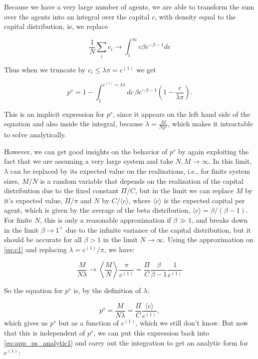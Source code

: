 Because we have a very large number of agents, we are able to transform the sum over the agents into an integral over the capital $c$, with density equal to the capital distribution, ie, we replace

\begin{equation}
\frac{1}{N} \sum_i c_i \to \int_1^\infty c \beta c^{-\beta - 1} dc
\end{equation}

Thus when we truncate by $c_i \leq \lambda \pi = c^{(1)}$ we get

\begin{equation}
\label{eq:app_ps_analytic1}
p^s = 1 - \int_1^{c^{(1)} = \lambda \pi} dc\, \beta c^{-\beta - 1} \left( 1 - \frac{c}{\lambda \pi} \right) .
\end{equation}

This is an implicit expression for $p^s$, since it appears on the left hand side of the equation and also inside the integral, because $\lambda = \frac{M}{N p^s}$, which makes it intractable to solve analytically. 

However, we can get good insights on the behavior of $p^s$ by again exploiting the fact that we are assuming a very large system and take $N, M \to \infty$. In this limit, $\lambda$ can be replaced by its expected value on the realizations, i.e., for finite system sizes, $M/N$ is a random variable that depends on the realization of the capital distribution due to the fixed constant $\Pi/C$, but in the limit we can replace $M$ by it's expected value, $\Pi/\pi$ and $N$ by $C / \langle c \rangle$, where $\langle c \rangle$ is the expected capital per agent, which is given by the average of the beta distribution, $\langle c \rangle = \beta/(\beta-1)$. For finite $N$, this is only a reasonable approximation if $\beta \gg 1$, and breaks down in the limit $\beta \to 1^+$ due to the infinite variance of the capital distribution, but it should be accurate for all $\beta > 1$ in the limit $N \to \infty$. Using the approximation on \eqref{eq:c1} and replacing $\lambda = c^{(1)} / \pi$, we have:

\begin{equation}
\frac{M}{N \lambda} \to \left \langle \frac{M}{N} \right \rangle \frac{\pi}{c^{(1)}} = \frac{\Pi}{C} \frac{\beta}{\beta - 1} \frac{1}{c^{(1)}}
\end{equation}

So the equation for $p^s$ is, by the definition of $\lambda$:

\begin{equation}
 \label{Eq:ps_correct}
p^s = \frac{M}{N \lambda} = \frac{\Pi}{C} \frac{\langle c \rangle}{c^{(1)}},
\end{equation} 
which gives us $p^s$ but as a function of $c^{(1)}$, which we still don't know. But now that this is independent of $p^s$, we can put this expression back into \eqref{eq:app_ps_analytic1} and carry out the integration to get an analytic form for $c^{(1)}$:

